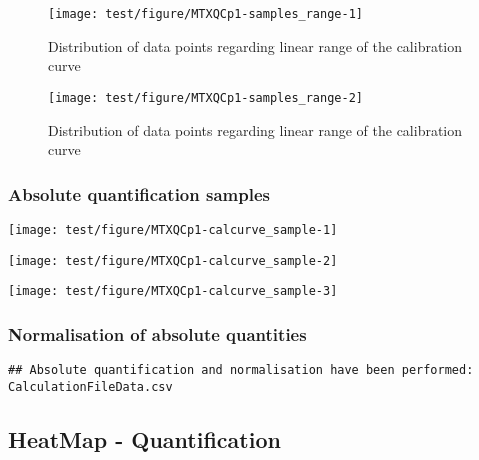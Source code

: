 \documentclass[9pt,]{article}
\begin{document}
\begin{figure}

{\centering \texttt{[image: test/figure/MTXQCp1-samples\_range-1]} 

}

\caption{Distribution of data points regarding linear range of the calibration curve}\label{fig:samples_range1}
\end{figure}\begin{figure}

{\centering \texttt{[image: test/figure/MTXQCp1-samples\_range-2]} 

}

\caption{Distribution of data points regarding linear range of the calibration curve}\label{fig:samples_range2}
\end{figure}

\subsubsection{Absolute quantification
samples}\label{absolute-quantification-samples}

\begin{center}\texttt{[image: test/figure/MTXQCp1-calcurve\_sample-1]} \end{center}

\begin{center}\texttt{[image: test/figure/MTXQCp1-calcurve\_sample-2]} \end{center}

\begin{center}\texttt{[image: test/figure/MTXQCp1-calcurve\_sample-3]} \end{center}

\subsubsection{Normalisation of absolute
quantities}\label{normalisation-of-absolute-quantities}

\begin{verbatim}
## Absolute quantification and normalisation have been performed: CalculationFileData.csv
\end{verbatim}

\subsection{HeatMap - Quantification}\label{heatmap---quantification}

\clearpage
\end{document}
